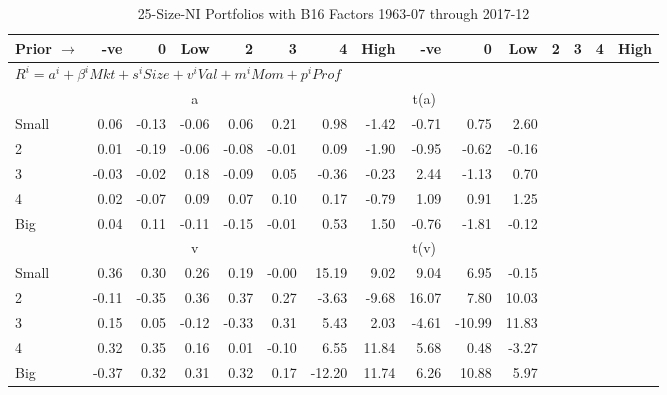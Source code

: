 
\begin{table}[!ht]
\footnotesize
\centering
\caption{25-Size-NI Portfolios with B16 Factors 1963-07 through 2017-12}
\begin{tabular}{lrrrrrrrrrrrrrr}
  \toprule
    Prior $\rightarrow$ & -ve & 0 & Low & 2 & 3 & 4 & High & -ve & 0 & Low & 2 & 3 & 4 & High \\ 
  \midrule
  \multicolumn{11}{l}{$R^i=a^i+\beta^iMkt+s^iSize+v^iVal+m^iMom+p^iProf$} \\

  
    
      & \multicolumn{5}{c}{a} & \multicolumn{5}{c}{t(a)}
    
    \\
      \cmidrule(r){2-6} \cmidrule(r){7-11}

    Small   & 0.06  & -0.13  & -0.06  & 0.06  & 0.21  & 0.98  & -1.42  & -0.71  & 0.75  & 2.60  \\
         2  & 0.01  & -0.19  & -0.06  & -0.08  & -0.01  & 0.09  & -1.90  & -0.95  & -0.62  & -0.16  \\
         3  & -0.03  & -0.02  & 0.18  & -0.09  & 0.05  & -0.36  & -0.23  & 2.44  & -1.13  & 0.70  \\
         4  & 0.02  & -0.07  & 0.09  & 0.07  & 0.10  & 0.17  & -0.79  & 1.09  & 0.91  & 1.25  \\
    Big     & 0.04  & 0.11  & -0.11  & -0.15  & -0.01  & 0.53  & 1.50  & -0.76  & -1.81  & -0.12  \\

  
    
      & \multicolumn{5}{c}{v} & \multicolumn{5}{c}{t(v)}
    
    \\
      \cmidrule(r){2-6} \cmidrule(r){7-11}

    Small   & 0.36  & 0.30  & 0.26  & 0.19  & -0.00  & 15.19  & 9.02  & 9.04  & 6.95  & -0.15  \\
         2  & -0.11  & -0.35  & 0.36  & 0.37  & 0.27  & -3.63  & -9.68  & 16.07  & 7.80  & 10.03  \\
         3  & 0.15  & 0.05  & -0.12  & -0.33  & 0.31  & 5.43  & 2.03  & -4.61  & -10.99  & 11.83  \\
         4  & 0.32  & 0.35  & 0.16  & 0.01  & -0.10  & 6.55  & 11.84  & 5.68  & 0.48  & -3.27  \\
    Big     & -0.37  & 0.32  & 0.31  & 0.32  & 0.17  & -12.20  & 11.74  & 6.26  & 10.88  & 5.97  \\

  
    

\end{tabular}
\end{table}
